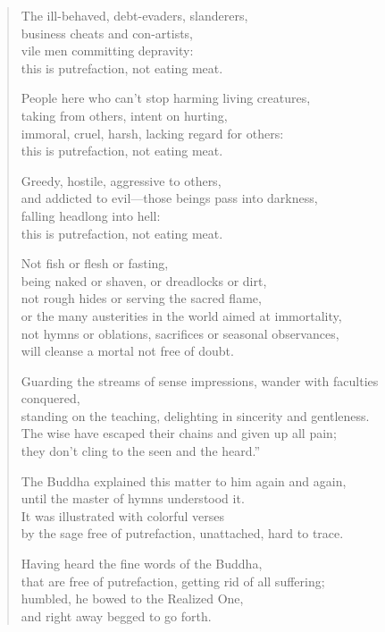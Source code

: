 \documentclass[12pt,openany]{book}%
\begin{document}
\begin{verse}
The ill-behaved, debt-evaders, slanderers, \\
business cheats and con-artists, \\
vile men committing depravity: \\
this is putrefaction, not eating meat. 

People here who can’t stop harming living creatures, \\
taking from others, intent on hurting, \\
immoral, cruel, harsh, lacking regard for others: \\
this is putrefaction, not eating meat. 

Greedy, hostile, aggressive to others, \\
and addicted to evil—those beings pass into darkness, \\
falling headlong into hell: \\
this is putrefaction, not eating meat. 

Not fish or flesh or fasting, \\
being naked or shaven, or dreadlocks or dirt, \\
not rough hides or serving the sacred flame, \\
or the many austerities in the world aimed at immortality, \\
not hymns or oblations, sacrifices or seasonal observances, \\
will cleanse a mortal not free of doubt. 

Guarding the streams of sense impressions, wander with faculties conquered, \\
standing on the teaching, delighting in sincerity and gentleness. \\
The wise have escaped their chains and given up all pain; \\
they don’t cling to the seen and the heard.” 

The Buddha explained this matter to him again and again, \\
until the master of hymns understood it. \\
It was illustrated with colorful verses \\
by the sage free of putrefaction, unattached, hard to trace. 

Having heard the fine words of the Buddha, \\
that are free of putrefaction, getting rid of all suffering; \\
humbled, he bowed to the Realized One, \\
and right away begged to go forth. 

%
\end{verse}
\end{document}
